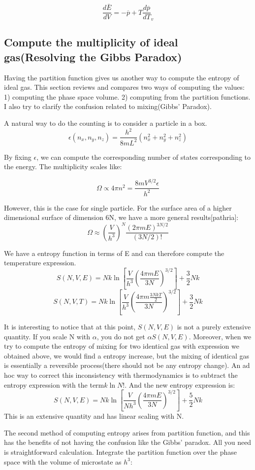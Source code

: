 \documentclass[12pt, oneside]{article}   	%
\begin{document}
$$\frac{d \bar{E}}{dV}  = - \overline{p} + T \frac{d \overline{p}}{d T}_v$$

\subsection{Compute the multiplicity of ideal gas(Resolving the Gibbs Paradox) }
 \par 
Having the partition function gives us another way to compute the entropy of ideal gas. This section reviews and compares two ways of computing the values: 1) computing the phase space volume. 2) computing from the partition functions. I also try to clarify the confusion related to mixing(Gibbs' Paradox). 

A natural way to do the counting is to consider a particle in a box. 
$$\epsilon(n_x, n_y, n_z) = \frac{h^2}{8m L^2} (n_x^2 + n_y^2 + n_z^2)$$

By fixing $\epsilon$, we can compute the corresponding number of states corresponding to the energy. The multiplicity scales like: 

$$\Omega \propto 4 \pi n^2 = \frac{8 m V^{3/2} \epsilon}{h^2} $$

However, this is the case for single particle. For the surface area of a higher dimensional surface of dimension 6N, we have a more general results[pathria]:
$$\Omega \approx  (\frac{V}{h^3})^N \frac{(2 \pi m E) ^{3N/2}}{(3N/2)! }$$
\par 
We have a entropy function in terms of E and can therefore compute the temperature expression.
$$S(N,V,E) = N k \ln [\frac{V}{h^3} (\frac{4\pi m E}{3N})^{3/2}] + \frac{3}{2} N k$$
$$S(N,V,T) = N k \ln [\frac{V}{h^3} (\frac{4\pi m \frac{3N k T}{2}}{3N})^{3/2}] + \frac{3}{2} N k$$

It is interesting to notice that at this point, $S(N,V,E)$ is not a purely extensive quantity. If you scale N with $\alpha$, you do not get $\alpha S(N,V,E)$. Moreover, when we try to compute the entropy of mixing for two identical gas with expression we obtained above, we would find a entropy increase, but the mixing of identical gas is essentially a reversible process(there should not be any entropy change). 
An ad hoc way to correct this inconsistency with thermodynamics is to subtract the entropy expression with the term$k \ln N! $. And the new entropy expression is: 
$$S(N,V,E) = Nk \ln[\frac{V}{N h^3} (\frac{4\pi m E}{3N})^{3/2}] + \frac{5}{2} N k$$ 
This is an extensive quantity and has linear scaling with N. 
\par 
The second method of computing entropy arises from partition function, and this has the benefits of not having the confusion like the Gibbs' paradox. All you need is straightforward calculation. Integrate the partition function over the phase space with the volume of microstate as $h^3$: 
\end{document}

